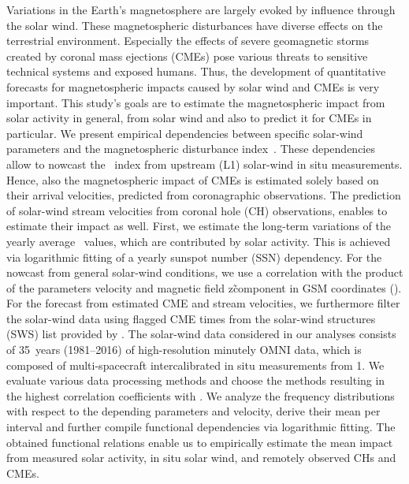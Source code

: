 

% 
% 

\abstracty
{Variations in the Earth's magnetosphere are largely evoked by influence through the solar wind. These magnetospheric disturbances have diverse effects on the terrestrial environment. Especially the effects of severe geomagnetic storms created by coronal mass ejections (CMEs) pose various threats to sensitive technical systems and exposed humans. Thus, the development of quantitative forecasts for magnetospheric impacts caused by solar wind and CMEs is very important.}	%
{This study's goals are to estimate the magnetospheric impact from solar activity in general, from solar wind and also to predict it for CMEs in particular. We present empirical dependencies between specific solar-wind parameters and the magnetospheric disturbance index~\Kp{}. These dependencies allow to nowcast the \Kp~index from upstream (L1) solar-wind in situ measurements. Hence, also the magnetospheric impact of CMEs is estimated solely based on their arrival velocities, predicted from coronagraphic observations. The prediction of solar-wind stream velocities from coronal hole (CH) observations, enables to estimate their impact as well.}	%
{First, we estimate the long-term variations of the yearly average \Kp{}~values, which are contributed by solar activity. This is achieved via logarithmic fitting of a yearly sunspot number (SSN) dependency. For the \Kp{} nowcast from general solar-wind conditions, we use a correlation with the product of the parameters velocity and magnetic field z\~component in GSM coordinates (\vBz{}). For the \Kp{} forecast from estimated CME and stream velocities, we furthermore filter the solar-wind data using flagged CME times from the solar-wind structures (SWS) list provided by \citet{Richardson2012}. The solar-wind data considered in our analyses consists of 35~years (1981--2016) of high-resolution minutely OMNI data, which is composed of multi-spacecraft intercalibrated in situ measurements from \SI{1}{\au}. We evaluate various data processing methods and choose the methods resulting in the highest correlation coefficients with \Kp{}. We analyze the \Kp{} frequency distributions with respect to the depending parameters \vBz{} and velocity, derive their mean \Kp{} per interval and further compile functional dependencies via logarithmic fitting.}	%
{The obtained functional relations enable us to empirically estimate the mean \Kp{} impact from measured solar activity, in situ solar wind, and remotely observed CHs and CMEs.}	%
{}	%

% 
